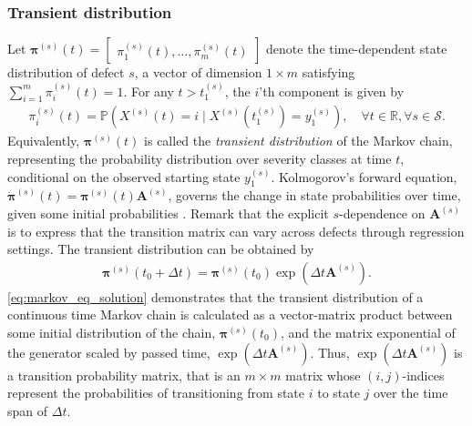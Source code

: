 \documentclass{article}
\begin{document}
\subsubsection{Transient distribution} \label{sec:transient_dist}
Let $\bm{\pi}^{(s)}(t) = \begin{bmatrix} \pi^{(s)}_1(t), \dots, \pi^{(s)}_m(t) \end{bmatrix}$ denote the time-dependent state distribution of defect $s$, a vector of dimension $1 \times m$ satisfying $\sum_{i = 1}^m \pi^{(s)}_i(t) = 1$. For any $t>t_1^{(s)}$, the $i$'th component is given by
\begin{align}
\pi_i^{(s)}(t) = \mathds{P} \left( X^{(s)}(t) = i \mid X^{(s)}(t_1^{(s)}) = y_1^{(s)}  \right), \quad \forall t\in \mathbb{R}, \forall s \in \mathcal{S}. \label{eq:transient_dist} 
\end{align}
Equivalently, $\bm{\pi}^{(s)}(t)$ is called the \textit{transient distribution} of the Markov chain, representing the probability distribution over severity classes at time $t$, conditional on the observed starting state $y_1^{(s)}$.
Kolmogorov's forward equation, $\Dot{\bm{\pi}}^{(s)}(t) = \bm{\pi}^{(s)}(t) \bm{A}^{(s)}$, governs the change in state probabilities over time, given some initial probabilities \citep[Section 1.3]{bladt_nielsen}. Remark that the explicit $s$-dependence on $\bm{A}^{(s)}$ is to express that the transition matrix can vary across defects through regression settings.
The transient distribution can be obtained by
\begin{equation}
\begin{aligned}
                  \bm{\pi}^{(s)}(t_0 + \Delta t) = 
                  \bm{\pi}^{(s)}(t_0) \exp{ ( \Delta t \bm{A}^{(s)} ) }. \label{eq:markov_eq_solution} %
\end{aligned}     
\end{equation}
\cref{eq:markov_eq_solution} demonstrates that the transient distribution of a continuous time Markov chain is calculated as a vector-matrix product between some initial distribution of the chain, $\bm{\pi}^{(s)}(t_0)$, and the matrix exponential of the generator scaled by passed time, $\exp{ ( \Delta t \bm{A}^{(s)} ) }$. Thus, $\exp{ ( \Delta t \bm{A}^{(s)} ) }$ is a transition probability matrix, that is an $m \times m$ matrix whose $(i,j)$-indices represent the probabilities of transitioning from state $i$ to state $j$ over the time span of $\Delta t$.
\end{document}
